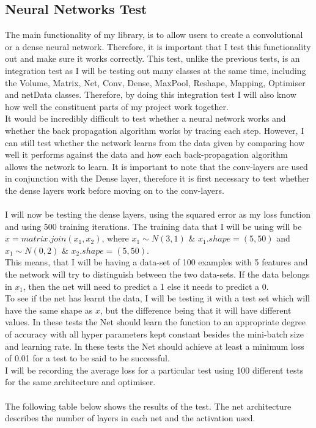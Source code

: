 \subsection{Neural Networks Test}
The main functionality of my library, is to allow users to create a convolutional or a dense neural network. Therefore, it is important that I test this functionality out and make sure it works correctly. This test, unlike the previous tests, is an integration test as I will be testing out many classes at the same time, including the Volume, Matrix, Net, Conv, Dense, MaxPool, Reshape, Mapping, Optimiser and netData classes. Therefore, by doing this integration test I will also know how well the constituent parts of my project work together.
\\
It would be incredibly difficult to test whether a neural network works and whether the back propagation algorithm works by tracing each step. However, I can still test whether the network learns from the data given by comparing how well it performs against the data and how each back-propagation algorithm allows the network to learn. It is important to note that the conv-layers are used in conjunction with the Dense layer, therefore it is first necessary to test whether the dense layers work before moving on to the conv-layers.
\\ \\
I will now be testing the dense layers, using the squared error as my loss function and using 500 training iterations.
The training data that I will be using will be $x = matrix.join(x_1, x_2)$, where $x_1 \sim N(3, 1)$ \& $x_1.shape = (5, 50)$ and $x_1 \sim N(0, 2)$ \& $x_2.shape = (5, 50)$.
\\
This means, that I will be having a data-set of 100 examples with 5 features and the network will try to distinguish between the two data-sets. If the data belongs in $x_1$, then the net will need to predict a 1 else it needs to predict a 0.
\\
To see if the net has learnt the data, I will be testing it with a test set which will have the same shape as $x$, but the difference being that it will have different values. In these tests the Net should learn the function to an appropriate degree of accuracy with all hyper parameters kept constant besides the mini-batch size and learning rate. In these tests the Net should achieve at least a minimum loss of 0.01 for a test to be said to be successful. 
\\
I will be recording the average loss for a particular test using 100 different tests for the same architecture and optimiser.
\\ \\
The following table below shows the results of the test. The net architecture describes the number of layers in each net and the activation used.

